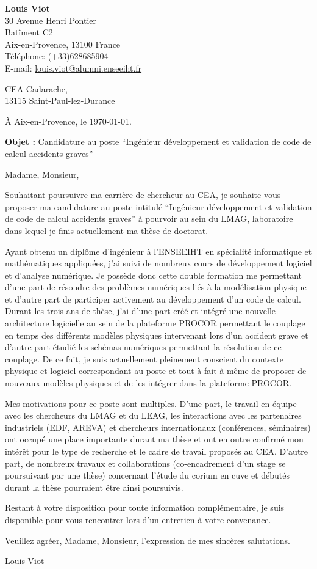\documentclass[11pt]{article}
\begin{document}
\begin{flushleft}
	\textbf{Louis Viot}\\
	30 Avenue Henri Pontier \\
	Batîment C2 \\
	Aix-en-Provence, 13100 France\\
	Téléphone: (+33)628685904 \\
	E-mail: \href{mailto:louis.viot@alumni.enseeiht.fr}{louis.viot@alumni.enseeiht.fr} \\
\end{flushleft}
\vspace{0.5 cm}
\begin{flushright}
	CEA Cadarache,\\
	13115 Saint-Paul-lez-Durance\\
\end{flushright}
\begin{flushright}
À Aix-en-Provence, le \today{}.
\end{flushright}
\textbf{Objet :} Candidature au poste ``Ingénieur développement et validation de code de calcul accidents graves''

Madame, Monsieur,

Souhaitant poursuivre ma carrière de chercheur au CEA, je souhaite vous proposer ma candidature au poste intitulé ``Ingénieur développement et validation de code de calcul accidents graves'' à pourvoir au sein du LMAG, laboratoire dans lequel je finis actuellement ma thèse de doctorat.

Ayant obtenu un diplôme d'ingénieur à l'ENSEEIHT en spécialité informatique et mathématiques appliquées, j'ai suivi de nombreux cours de développement logiciel et d'analyse numérique. Je possède donc cette double formation me permettant d'une part de résoudre des problèmes numériques liés à la modélisation physique et d'autre part de participer activement au développement d'un code de calcul. Durant les trois ans de thèse, j'ai d'une part créé et intégré une nouvelle architecture logicielle au sein de la plateforme PROCOR permettant le couplage en temps des différents modèles physiques intervenant lors d'un accident grave et d'autre part étudié les schémas numériques permettant la résolution de ce couplage. De ce fait, je suis actuellement pleinement conscient du contexte physique et logiciel correspondant au poste et tout à fait à même de proposer de nouveaux modèles physiques et de les intégrer dans la plateforme PROCOR.

Mes motivations pour ce poste sont multiples. D'une part, le travail en équipe avec les chercheurs du LMAG et du LEAG, les interactions avec les partenaires industriels (EDF, AREVA) et chercheurs internationaux (conférences, séminaires) ont occupé une place importante durant ma thèse et ont en outre confirmé mon intérêt pour le type de recherche et le cadre de travail proposés au CEA. D'autre part, de nombreux travaux et collaborations (co-encadrement d'un stage se poursuivant par une thèse) concernant l'étude du corium en cuve et débutés durant la thèse pourraient être ainsi poursuivis.

Restant à votre disposition pour toute information complémentaire, je suis disponible pour vous rencontrer lors d’un entretien à votre convenance.

Veuillez agréer, Madame, Monsieur, l’expression de mes sincères salutations.

\begin{flushright}
Louis Viot
\end{flushright}
\end{document}
